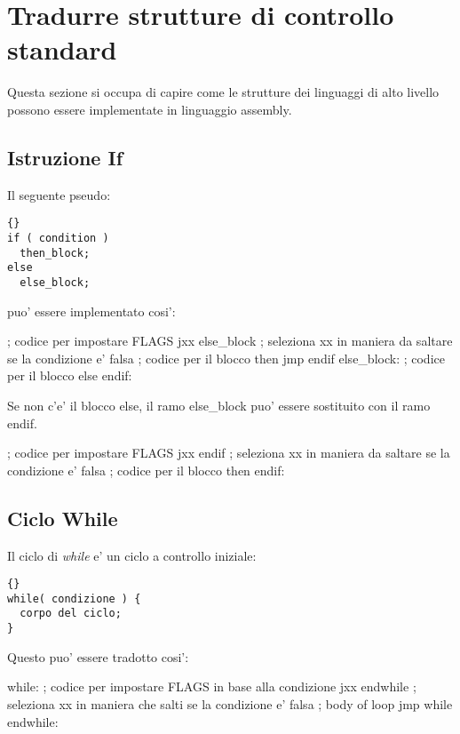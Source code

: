 \section{Tradurre strutture di controllo standard}

Questa sezione si occupa di capire come le strutture dei linguaggi di
alto livello possono essere implementate in linguaggio assembly.

\subsection{Istruzione If }
Il seguente pseudo:
\begin{lstlisting}[stepnumber=0]{}
if ( condition )
  then_block;
else
  else_block;
\end{lstlisting}
\noindent puo' essere implementato cosi':
\begin{AsmCodeListing}[frame=none]
      ; codice per impostare FLAGS
      jxx    else_block    ; seleziona xx in maniera da saltare se la condizione e' falsa
      ; codice per il blocco then
      jmp    endif
else_block:
      ; codice per il blocco else
endif:
\end{AsmCodeListing}

Se non c'e' il blocco else, il ramo {\code else\_block} puo' essere
sostituito con il ramo {\code endif}.
\begin{AsmCodeListing}[frame=none]
      ; codice per impostare FLAGS
      jxx    endif    ; seleziona xx in maniera da saltare se la condizione e' falsa
      ; codice per il blocco then
endif:
\end{AsmCodeListing}

\subsection{Ciclo While }
Il ciclo di \emph{while} e' un ciclo a controllo iniziale:
\begin{lstlisting}[stepnumber=0]{}
while( condizione ) {
  corpo del ciclo;
}
\end{lstlisting}
\noindent Questo puo' essere tradotto cosi':
\begin{AsmCodeListing}[frame=none]
while:
      ; codice per impostare FLAGS in base alla condizione
      jxx    endwhile     ; seleziona xx in maniera che salti se la condizione e' falsa
      ; body of loop
      jmp    while
endwhile:
\end{AsmCodeListing}

